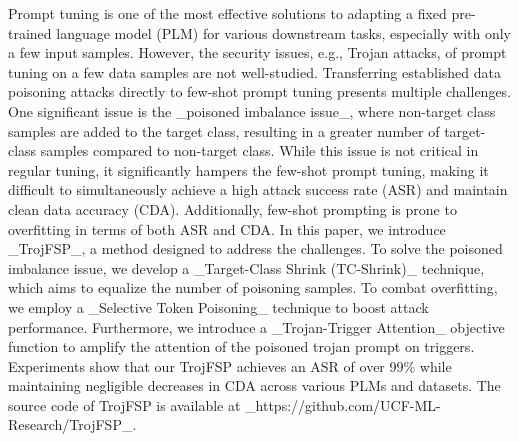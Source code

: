 Prompt tuning is one of the most effective solutions to adapting a fixed pre-trained language model (PLM) for various downstream tasks, especially with only a few input samples. However, the security issues, e.g., Trojan attacks, of prompt tuning on a few data samples are not well-studied.  Transferring established data poisoning attacks directly to few-shot prompt tuning presents multiple challenges. One significant issue is the \_poisoned imbalance issue\_, where non-target class samples are added to the target class, resulting in a greater number of target-class samples compared to non-target class. While this issue is not critical in regular tuning, it significantly hampers the few-shot prompt tuning, making it difficult to simultaneously achieve a high attack success rate (ASR) and maintain clean data accuracy (CDA). Additionally, few-shot prompting is prone to overfitting in terms of both ASR and CDA. In this paper, we introduce \_TrojFSP\_, a method designed to address the challenges. To solve the poisoned imbalance issue, we develop a \_Target-Class Shrink (TC-Shrink)\_ technique, which aims to equalize the number of poisoning samples. To combat overfitting, we employ a \_Selective Token Poisoning\_ technique to boost attack performance. Furthermore, we introduce a \_Trojan-Trigger Attention\_ objective function to amplify the attention of the poisoned trojan prompt on triggers. Experiments show that our TrojFSP achieves an ASR of over 99\% while maintaining negligible decreases in CDA across various PLMs and datasets. The source code of TrojFSP is available at \_https://github.com/UCF-ML-Research/TrojFSP\_.